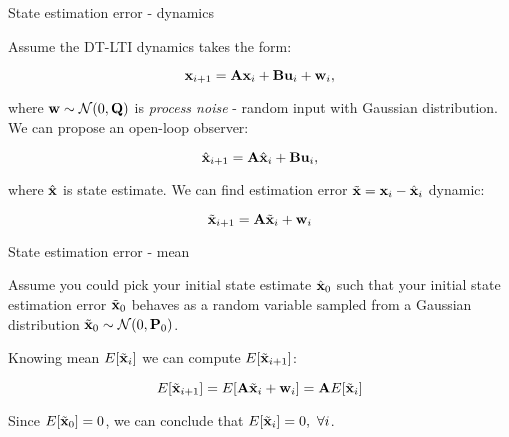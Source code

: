 \documentclass{beamer}
\begin{document}
\begin{frame}{State estimation error - dynamics}
	\begin{flushleft}
		
		Assume the DT-LTI dynamics takes the form:
		
		\begin{equation}
			\mathbf{x}_{i+1} = \mathbf{A} \mathbf{x}_i + \mathbf{B} \mathbf{u}_i + \mathbf{w}_i,
		\end{equation}
		
		where $\mathbf{w} \sim \mathcal{N} (0, \mathbf{Q})$ is \emph{process noise} - random input with Gaussian distribution. We can propose an open-loop observer:
		
		\begin{equation}
			\hat{\mathbf{x}}_{i+1} = \mathbf{A} \hat{\mathbf{x}}_i + \mathbf{B} \mathbf{u}_i, 
		\end{equation}
		
		where $\hat{\mathbf{x}}$ is state estimate. We can find estimation error $\Tilde{\mathbf{x}} = \mathbf{x}_i - \hat{\mathbf{x}}_i$ dynamic:
		
		\begin{equation}
			\Tilde{\mathbf{x}}_{i+1} = \mathbf{A} \Tilde{\mathbf{x}}_i + \mathbf{w}_i
		\end{equation}
		
	\end{flushleft}
\end{frame}



\begin{frame}{State estimation error - mean}
	\begin{flushleft}
		
		Assume you could pick your initial state estimate $\hat{\mathbf{x}}_0$ such that your initial state estimation error $\Tilde{\mathbf{x}}_0$ behaves as a random variable sampled from a  Gaussian distribution $\Tilde{\mathbf{x}}_0 \sim \mathcal{N} (0, \mathbf{P}_0)$.
		
		\bigskip
		
		Knowing mean $E[\Tilde{\mathbf{x}}_i]$ we can compute $E[\Tilde{\mathbf{x}}_{i+1}]$:
		
		\begin{equation}
			E[\Tilde{\mathbf{x}}_{i+1}] = E[\mathbf{A} \Tilde{\mathbf{x}}_i + \mathbf{w}_i] = 
			\mathbf{A} E[\Tilde{\mathbf{x}}_i]
		\end{equation}		
	
		Since $E[\Tilde{\mathbf{x}}_0] = 0$, we can conclude that $E[\Tilde{\mathbf{x}}_i] = 0, \ \forall i$.
		
		
	\end{flushleft}
\end{frame}
\end{document}
